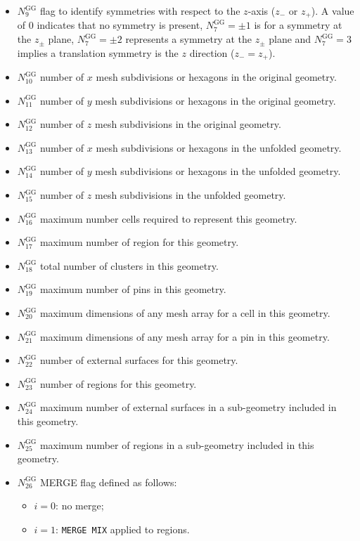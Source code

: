 \begin{itemize}
\item $N^{\text{GG}}_{9}$ flag to identify symmetries with respect to the $z$-axis ($z_{-}$ or $z_{+}$). A value of $0$ indicates that no symmetry is present, $N^{\text{GG}}_{7}=\pm 1$ is for a  symmetry at the $z_{\pm}$ plane, $N^{\text{GG}}_{7}=\pm 2$ represents a  symmetry at the $z_{\pm}$ plane and $N^{\text{GG}}_{7}= 3$ implies a translation symmetry is the $z$ direction ($z_{-}=z_{+}$).
\item $N^{\text{GG}}_{10}$ number of $x$ mesh subdivisions or hexagons in the original geometry.
\item $N^{\text{GG}}_{11}$ number of $y$ mesh subdivisions or hexagons in the original geometry.
\item $N^{\text{GG}}_{12}$ number of $z$ mesh subdivisions in the original geometry.
\item $N^{\text{GG}}_{13}$ number of $x$ mesh subdivisions or hexagons in the unfolded geometry.
\item $N^{\text{GG}}_{14}$ number of $y$ mesh subdivisions or hexagons in the unfolded geometry.
\item $N^{\text{GG}}_{15}$ number of $z$ mesh subdivisions in the unfolded geometry.
\item $N^{\text{GG}}_{16}$ maximum number cells required to represent this geometry.
\item $N^{\text{GG}}_{17}$ maximum number of region for this geometry.
\item $N^{\text{GG}}_{18}$ total number of clusters in this geometry.
\item $N^{\text{GG}}_{19}$ maximum number of pins in this geometry.
\item $N^{\text{GG}}_{20}$ maximum dimensions of any mesh array for a cell in this geometry.
\item $N^{\text{GG}}_{21}$ maximum dimensions of any mesh array for a pin in this geometry. 
\item $N^{\text{GG}}_{22}$ number of external surfaces for this geometry.
\item $N^{\text{GG}}_{23}$ number of regions for this geometry.
\item $N^{\text{GG}}_{24}$ maximum number of external surfaces in a sub-geometry included in this geometry.
\item $N^{\text{GG}}_{25}$ maximum number of regions in a sub-geometry included in this geometry.
\item $N^{\text{GG}}_{26}$ MERGE flag defined as follows:
  \begin{itemize}
  \item $i=0$: no merge;
  \item $i=1$: {\tt MERGE MIX} applied to regions.
  \end{itemize}
\end{itemize}

